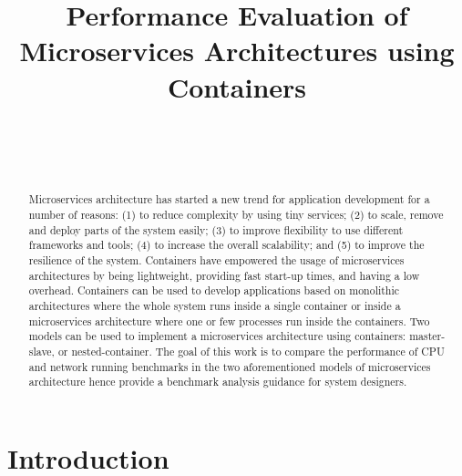 \documentclass[conference]{IEEEtran}
\begin{document}
\title{Performance Evaluation of  Microservices Architectures using Containers}

\author{
 \\
 \and
 \\
}

\maketitle
\thispagestyle{plain}
\pagestyle{plain}

\begin{abstract}
Microservices architecture has started a new trend for application development
for a number of reasons: (1) to reduce complexity by using tiny services; (2)
to scale, remove and deploy parts of the system easily; (3) to improve
flexibility to use different frameworks and tools; (4) to increase the overall
scalability; and (5) to improve the resilience of the system.
Containers have empowered the usage of microservices architectures by being
lightweight, providing fast start-up times, and having a low overhead.
Containers can be used to develop applications based on monolithic
architectures where the whole system runs inside a single container or inside
a microservices architecture where one or few processes run inside the
containers. Two models can be used to implement a microservices architecture
using containers: master-slave, or nested-container. The goal of this work is
to compare the performance of CPU and network running benchmarks in the two aforementioned models of microservices
architecture hence provide a benchmark analysis guidance for system designers.
\end{abstract}

\IEEEpeerreviewmaketitle

\section{Introduction}
\label{sec:introduction}
\end{document}
